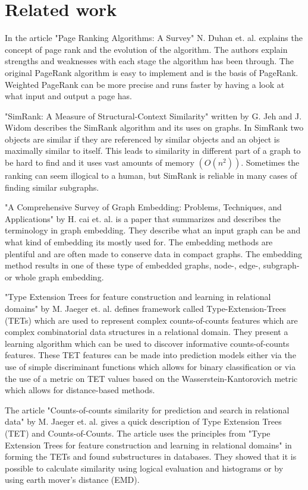 \section{Related work}
\label{Related_work}
In the article "Page Ranking Algorithms: A Survey" N. Duhan et. al.\cite{4809246} explains the concept of page rank and the evolution of the algorithm. The authors explain strengths and weaknesses with each stage the algorithm has been through. The original PageRank algorithm is easy to implement and is the basis of PageRank. Weighted PageRank can be more precise and runs faster by having a look at what input and output a page has.

"SimRank: A Measure of Structural-Context Similarity" written by G. Jeh and J. Widom\cite{10.1145/775047.775126} describes the SimRank algorithm and its uses on graphs. In SimRank two objects are similar if they are referenced by similar objects and an object is maximally similar to itself. This leads to similarity in different part of a graph to be hard to find and it uses vast amounts of memory $(O(n^2))$. Sometimes the ranking can seem illogical to a human, but SimRank is reliable in many cases of finding similar subgraphs.

"A Comprehensive Survey of Graph Embedding: Problems, Techniques, and Applications" by H. cai et. al.\cite{8294302} is a paper that summarizes and describes the terminology in graph embedding. They describe what an input graph can be and what kind of embedding its mostly used for. The embedding methods are plentiful and are often made to conserve data in compact graphs. The embedding method results in one of these type of embedded graphs, node-, edge-, subgraph- or whole graph embedding.

"Type Extension Trees for feature construction and learning in relational domains" by M. Jaeger et. al. \cite{JAEGER201330} defines framework called Type-Extension-Trees (TETs) which are used to represent complex counts-of-counts features which are complex combinatorial data structures in a relational domain. They present a learning algorithm which can be used to discover informative counts-of-counts features. These TET features can be made into prediction models either via the use of simple discriminant functions which allows for binary classification or via the use of a metric on TET values based on the Wasserstein-Kantorovich metric which allows for distance-based methods.

The article "Counts-of-counts similarity for prediction and search in relational data" by M. Jaeger et. al.\cite{jaeger2019counts}  gives a quick description of Type Extension Trees (TET) and Counts-of-Counts. The article uses the principles from "Type Extension Trees for feature construction and learning in relational domains" in forming the TETs and found substructures in databases. They showed that it is possible to calculate similarity using logical evaluation and histograms or by using earth mover's distance (EMD).

